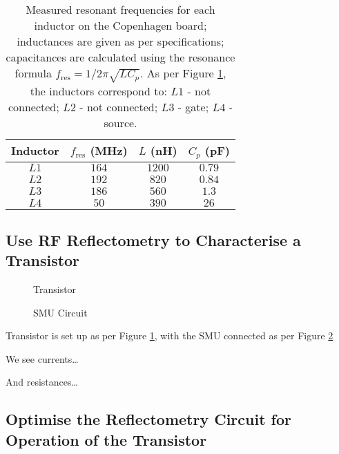 \documentclass{article}
\begin{document}
\begin{table}[htp]
    \centering
    \begin{tabular}{| c | c  | c | c |}
        \hline
        Inductor & $f_\mathrm{res}$ (\si{\mega\hertz}) & $L$ (\si{\nano\henry}) & $C_p$ (\si{\pico\farad}) \\[0.5ex]
        \hline \hline
        $L1$     & $164$                               & $1200$                 & $0.79$                   \\
        $L2$     & $192$                               & $820$                  & $0.84$                   \\
        $L3$     & $186$                               & $560$                  & $1.3$                    \\
        $L4$     & $50$                                & $390$                  & $26$                     \\ \hline
    \end{tabular}
    \caption{Measured resonant frequencies for each inductor on the Copenhagen board; inductances are given as per specifications; capacitances are calculated using the resonance formula $f_\mathrm{res} = 1/2\pi\sqrt{LC_p}$. As per Figure \ref{fig:transistor}, the inductors correspond to: $L1$ - not connected; $L2$ - not connected; $L3$ - gate; $L4$ - source.}
    \label{table:capacitances}
\end{table}

\subsection{Use RF Reflectometry to Characterise a Transistor}

\begin{figure}
    \caption{Transistor}
    \label{fig:transistor}
\end{figure}

\begin{figure}
    \caption{SMU Circuit}
    \label{fig:smu_circuit}
\end{figure}

Transistor is set up as per Figure \ref{fig:transistor}, with the SMU connected as per Figure \ref{fig:smu_circuit}

We see currents\dots

And resistances\dots

\subsection{Optimise the Reflectometry Circuit for Operation of the Transistor}
\end{document}
